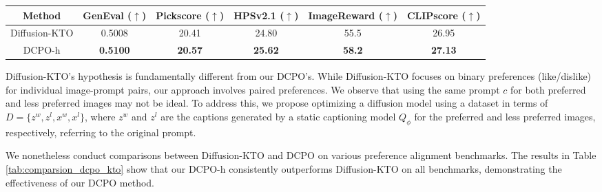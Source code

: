 \begin{table*}[h]
\centering
\small
\begin{tabular}{c|ccccc}
\toprule
\textbf{Method} & \textbf{GenEval ($\uparrow$)}         & \textbf{Pickscore ($\uparrow$)}      & \textbf{HPSv2.1 ($\uparrow$)} & \textbf{ImageReward ($\uparrow$)} & \textbf{CLIPscore ($\uparrow$)} \\ \midrule
Diffusion-KTO  &   0.5008   &  20.41   &   24.80    &   55.5   &    26.95  \\ 
DCPO-h & \textbf{0.5100}   & \textbf{20.57}  &   \textbf{25.62}   &    \textbf{58.2}    &   \textbf{27.13}   \\ \bottomrule
\end{tabular}
\caption{Comparison of DCPO-h and Diffusion-KTO across various benchmarks.}
\label{tab:comparsion_dcpo_kto}
\end{table*}



Diffusion-KTO's hypothesis is fundamentally different from our DCPO's. While Diffusion-KTO focuses on binary preferences (like/dislike) for individual image-prompt pairs, our approach involves paired preferences. We observe that using the same prompt $ c $ for both preferred and less preferred images may not be ideal. To address this, we propose optimizing a diffusion model using a dataset in terms of $ D = \{z^w, z^l, x^w, x^l\} $, where $ z^w $ and $ z^l $ are the captions generated by a static captioning model $ Q_\phi $ for the preferred and less preferred images, respectively, referring to the original prompt.

% 
% 
We nonetheless conduct comparisons between Diffusion-KTO and DCPO on various preference alignment benchmarks. The results in Table \ref{tab:comparsion_dcpo_kto} show that our DCPO-h consistently outperforms Diffusion-KTO on all benchmarks, demonstrating the effectiveness of our DCPO method.

